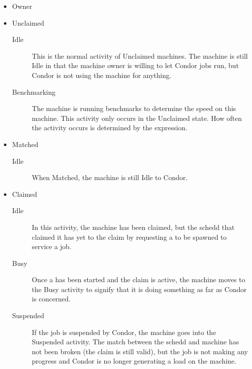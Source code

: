 \begin{itemize}

\item Owner

\item Unclaimed
\begin{description}
\item[Idle] This is the normal activity of Unclaimed machines.
  The machine is still Idle in that the machine owner is willing to
  let Condor jobs run, but Condor is not using the
  machine for anything.
  
\item[Benchmarking] The machine is running benchmarks to
  determine the speed on this machine.
  This activity only occurs in the Unclaimed state.
  How often the activity occurs is
  determined by the  expression.
\end{description}

\item Matched
\begin{description}
\item[Idle] When Matched, the machine is still Idle to Condor.
\end{description}

\item Claimed
\begin{description}
\item[Idle] In this activity, the machine has been claimed, but the
  schedd that claimed it has yet to  the claim by
  requesting a  to be spawned to service a job.
  
\item[Busy] Once a  has been started and the claim is
  active, the machine moves to the Busy activity to signify that it is
  doing something as far as Condor is concerned.
  
\item[Suspended] If the job is suspended by Condor, the machine goes
  into the Suspended activity.
  The match between the schedd and machine has not been broken (the
  claim is still valid), but the job is not making any progress and
  Condor is no longer generating a load on the machine.
\end{description}


\end{itemize}
